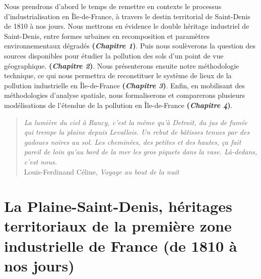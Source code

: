 \documentclass[a4paper,twoside,12pt]{book}
\newcommand{\siecle}[1]{\textsc{#1}\textsuperscript{e} siècle}
\begin{document}
Nous prendrons d'abord le temps de remettre en contexte le processus d'industrialisation en Île-de-France, à travers le destin territorial de Saint-Denis de 1810 à nos jours. Nous mettrons en évidence le double héritage industriel de Saint-Denis, entre formes urbaines en recomposition et paramètres environnementaux dégradés \textbf{(\textit{Chapitre 1})}. Puis nous soulèverons la question des sources disponibles pour étudier la pollution des sols d'un point de vue géographique. \textbf{(\textit{Chapitre 2})}. Nous présenterons ensuite notre méthodologie technique, ce qui nous permettra de reconstituer le système de lieux de la pollution industrielle en Île-de-France \textbf{(\textit{Chapitre 3})}. Enfin, en mobilisant des méthodologies d'analyse spatiale, nous formaliserons et comparerons plusieurs modélisations de l'étendue de la pollution en Île-de-France \textbf{(\textit{Chapitre 4})}.

\clearpage
\vspace*{5cm}
\hfill
\begin{minipage}{0.8\textwidth}
\begin{quotation}

\textit{ \og{} La lumière du ciel à Rancy, c'est la même qu'à Detroit, du jus de fumée qui trempe la plaine depuis Levallois. Un rebut de bâtisses tenues par des gadoues noires au sol. Les cheminées, des petites et des hautes, ça fait pareil de loin qu'au bord de la mer les gros piquets dans la vase. Là-dedans, c'est nous. \fg{} } \\

Louis-Ferdinand Céline, \textit{Voyage au bout de la nuit}
\end{quotation}
\hfill
\begin{minipage}{0.8\textwidth}
\flushright
\end{minipage}
\end{minipage}


\chapter{La Plaine-Saint-Denis, héritages territoriaux de la première zone industrielle de France (de 1810 à nos jours)}
\end{document}
